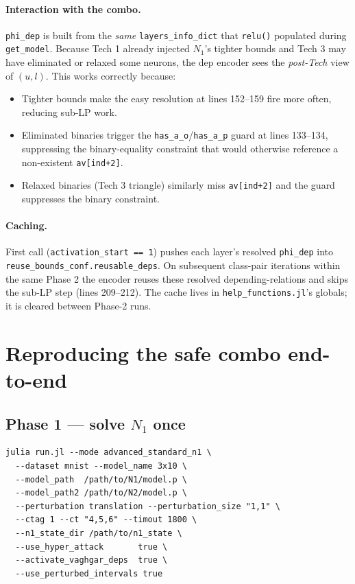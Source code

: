 \documentclass[11pt]{article}
\newcommand{\src}[1]{\texttt{\small #1}}
\begin{document}
\paragraph{Interaction with the combo.}
\src{phi\_dep} is built from the \emph{same} \src{layers\_info\_dict}
that \src{relu()} populated during \src{get\_model}. Because Tech 1
already injected $N_1$'s tighter bounds and Tech 3 may have eliminated
or relaxed some neurons, the dep encoder sees the \emph{post-Tech}
view of $(u, l)$. This works correctly because:
\begin{itemize}[noitemsep]
  \item Tighter bounds make the easy resolution at lines 152--159
    fire more often, reducing sub-LP work.
  \item Eliminated binaries trigger the \src{has\_a\_o}/\src{has\_a\_p}
    guard at lines 133--134, suppressing the binary-equality
    constraint that would otherwise reference a non-existent
    \src{av[ind+2]}.
  \item Relaxed binaries (Tech 3 triangle) similarly miss
    \src{av[ind+2]} and the guard suppresses the binary constraint.
\end{itemize}

\paragraph{Caching.}
First call (\src{activation\_start == 1}) pushes each layer's resolved
\src{phi\_dep} into \src{reuse\_bounds\_conf.reusable\_deps}. On
subsequent class-pair iterations within the same Phase 2 the
encoder reuses these resolved depending-relations and skips the
sub-LP step (lines 209--212). The cache lives in
\src{help\_functions.jl}'s globals; it is cleared between Phase-2
runs.

\section{Reproducing the safe combo end-to-end}
\label{sec:reproduce}

\subsection{Phase 1 --- solve $N_1$ once}

\begin{lstlisting}[basicstyle=\ttfamily\small,breaklines=true,frame=single]
julia run.jl --mode advanced_standard_n1 \
  --dataset mnist --model_name 3x10 \
  --model_path  /path/to/N1/model.p \
  --model_path2 /path/to/N2/model.p \
  --perturbation translation --perturbation_size "1,1" \
  --ctag 1 --ct "4,5,6" --timout 1800 \
  --n1_state_dir /path/to/n1_state \
  --use_hyper_attack       true \
  --activate_vaghgar_deps  true \
  --use_perturbed_intervals true
\end{lstlisting}
\end{document}
